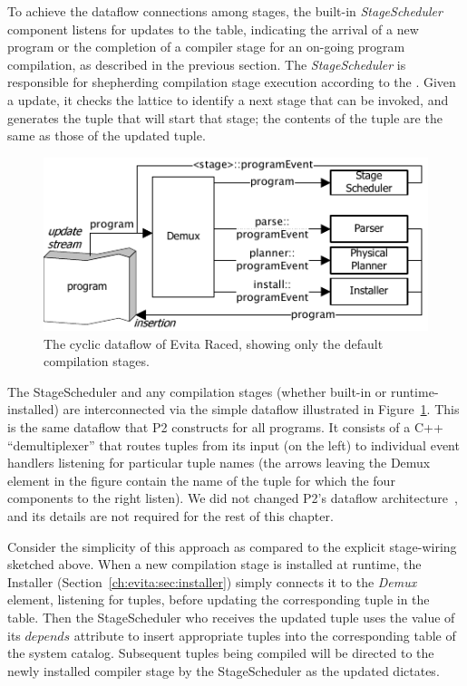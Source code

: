 To achieve the dataflow connections among stages, the built-in {\em
  StageScheduler} component listens for
updates to the  table, indicating the arrival of a new
\OVERLOG program or the completion of a compiler
stage for an on-going program compilation, as described in the previous section.  The {\em StageScheduler} is
responsible for shepherding compilation stage execution according to the
. Given a  update, it checks the lattice to identify a next stage
that can be invoked, and generates the
 tuple that will start that stage; the
contents of the tuple are the same as those of the updated
 tuple.  

\begin{figure}[htbp]
\begin{center}
\includegraphics{figures/DefaultCompiler}
\ssp
\caption{The cyclic dataflow of Evita Raced, showing only the default compilation stages.}
\label{ch:evita:fig:basecompiler}
\end{center}
\end{figure}

The StageScheduler and any compilation stages (whether built-in or
runtime-installed) are interconnected via the simple dataflow
illustrated in Figure~\ref{ch:evita:fig:basecompiler}. This is the same dataflow
that P2 constructs for all \OVERLOG programs. It consists of a C++ ``demultiplexer'' that
routes tuples from its input (on the left) to individual event handlers listening for
particular tuple names (the arrows leaving the Demux element in the
figure contain the name of the tuple for which the four components to the
right listen).  We did not changed P2's dataflow architecture~\cite{p2:sosp}, and its
details are not required for the rest of this chapter.  

Consider the simplicity of this approach as compared to the explicit
stage-wiring  sketched above. When a new compilation stage is installed
at runtime, the Installer (Section~\ref{ch:evita:sec:installer})
simply connects it to the {\em Demux} element, listening for
 tuples, before updating the corresponding
tuple in the  table. 
Then the StageScheduler who receives the updated  tuple uses
the value of its $depends$ attribute  to insert appropriate 
 tuples into the corresponding table of the
system catalog. Subsequent  tuples being compiled will be directed to
the newly installed compiler stage by the StageScheduler as the updated
 dictates.

